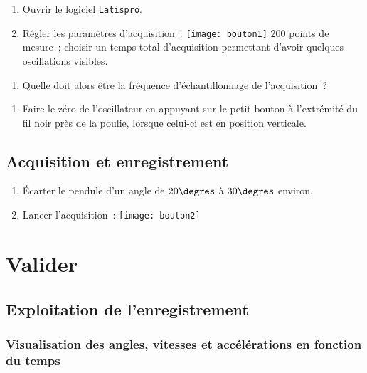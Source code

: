 \documentclass[a4paper, 11pt, final, garamond]{book}
\begin{document}
\begin{enumerate}
    \item Ouvrir le logiciel \texttt{Latispro}.
    \item Régler les paramètres d'acquisition~:
        \texttt{[image: bouton1]} $200$ points de mesure~;
        choisir un temps total d'acquisition permettant d'avoir quelques
        oscillations visibles.
\end{enumerate}
\begin{enumerate}[resume, label=\sqenumi]
    \item Quelle doit alors être la fréquence
        d'échantillonnage de l'acquisition~?
\end{enumerate}
\begin{enumerate}[resume]
    \item Faire le zéro de l'oscillateur en appuyant sur le petit bouton à
        l'extrémité du fil noir près de la poulie, lorsque celui-ci est en
        position verticale.
\end{enumerate}

\subsection{Acquisition et enregistrement}

\begin{enumerate}
    \item Écarter le pendule d'un angle de $20\degres$ à $30\degres$ environ.
    \item Lancer l'acquisition~: \texttt{[image: bouton2]}
\end{enumerate}


\section{Valider}

\subsection{Exploitation de l'enregistrement}

\subsubsection{Visualisation des angles, vitesses et accélérations en fonction du temps}
\end{document}
